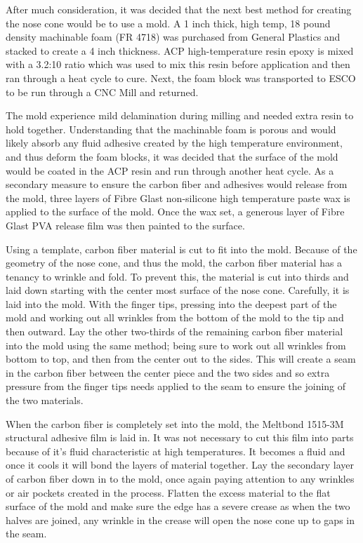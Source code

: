 \documentclass{aiaa-tc}%
\begin{document}
After much consideration, it was decided that the next best method for creating the nose cone would be to use a mold. A 1 inch thick, high temp, 18 pound density machinable foam (FR 4718) was purchased from General Plastics and stacked to create a 4 inch thickness. ACP high-temperature resin epoxy is mixed with a 3.2:10 ratio which was used to mix this resin before application and then ran through a heat cycle to cure. Next, the foam block was transported to ESCO to be run through a CNC Mill and returned. 

The mold experience mild delamination during milling and needed extra resin to hold together. Understanding that the machinable foam is porous and would likely absorb any fluid adhesive created by the high temperature environment, and thus deform the foam blocks, it was decided that the surface of the mold would be coated in the ACP resin and run through another heat cycle. As a secondary measure to ensure the carbon fiber and adhesives would release from the mold, three layers of Fibre Glast non-silicone high temperature paste wax is applied to the surface of the mold. Once the wax set, a generous layer of Fibre Glast PVA release film was then painted to the surface. 

Using a template, carbon fiber material is cut to fit into the mold. Because of the geometry of the nose cone, and thus the mold, the carbon fiber material has a tenancy to wrinkle and fold. To prevent this, the material is cut into thirds and laid down starting with the center most surface of the nose cone. Carefully, it is laid into the mold. With the finger tips, pressing into the deepest part of the mold and working out all wrinkles from the bottom of the mold to the tip and then outward. Lay the other two-thirds of the remaining carbon fiber material into the mold using the same method; being sure to work out all wrinkles from bottom to top, and then from the center out to the sides. This will create a seam in the carbon fiber between the center piece and the two sides and so extra pressure from the finger tips needs applied to the seam to ensure the joining of the two materials.

When the carbon fiber is completely set into the mold, the Meltbond 1515-3M structural adhesive film is laid in. It was not necessary to cut this film into parts because of it's fluid characteristic at high temperatures. It becomes a fluid and once it cools it will bond the layers of material together. Lay the secondary layer of carbon fiber down in to the mold, once again paying attention to any wrinkles or air pockets created in the process. Flatten the excess material to the flat surface of the mold and make sure the edge has a severe crease as when the two halves are joined, any wrinkle in the crease will open the nose cone up to gaps in the seam.
\end{document}
